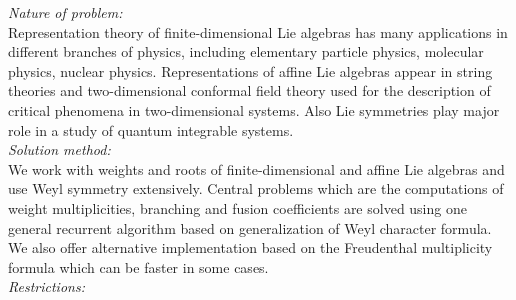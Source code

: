 \documentclass[preprint,12pt]{elsarticle}
\begin{document}
\begin{small}
{\em Nature of problem:}\\
Representation theory of finite-dimensional Lie algebras has many applications in different branches of physics, including elementary particle physics, molecular physics, nuclear physics. Representations of affine Lie algebras appear in string theories and two-dimensional conformal field theory used for the description of critical phenomena in two-dimensional systems. Also Lie symmetries play major role in a study of quantum integrable systems.
   \\
{\em Solution method:}\\
We work with weights and roots of finite-dimensional and affine Lie algebras and use Weyl symmetry extensively. Central problems which are the computations of weight multiplicities, branching and fusion coefficients are solved using one general recurrent algorithm based on generalization of Weyl character formula. We also offer alternative implementation based on the Freudenthal multiplicity formula which can be faster in some cases.
   \\
{\em Restrictions:}\\

\end{small}
\end{document}
